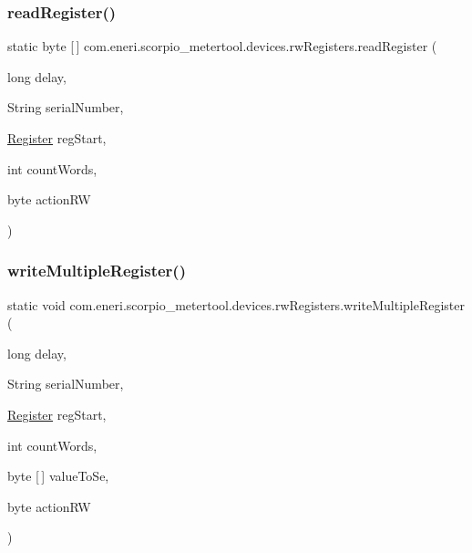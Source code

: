 \subsubsection{\texorpdfstring{read\+Register()}{readRegister()}}
{\footnotesize\ttfamily static byte \mbox{[}$\,$\mbox{]} com.\+eneri.\+scorpio\+\_\+metertool.\+devices.\+rw\+Registers.\+read\+Register (\begin{DoxyParamCaption}\item[{long}]{delay,  }\item[{String}]{serial\+Number,  }\item[{\hyperlink{enumcom_1_1eneri_1_1scorpio__metertool_1_1devices_1_1_register}{Register}}]{reg\+Start,  }\item[{int}]{count\+Words,  }\item[{byte}]{action\+RW }\end{DoxyParamCaption})\hspace{0.3cm}{\ttfamily [static]}}

\mbox{\label{classcom_1_1eneri_1_1scorpio__metertool_1_1devices_1_1rw_registers_a0e767199ee64a5b279df608b2e12caf6}} 
\subsubsection{\texorpdfstring{write\+Multiple\+Register()}{writeMultipleRegister()}}
{\footnotesize\ttfamily static void com.\+eneri.\+scorpio\+\_\+metertool.\+devices.\+rw\+Registers.\+write\+Multiple\+Register (\begin{DoxyParamCaption}\item[{long}]{delay,  }\item[{String}]{serial\+Number,  }\item[{\hyperlink{enumcom_1_1eneri_1_1scorpio__metertool_1_1devices_1_1_register}{Register}}]{reg\+Start,  }\item[{int}]{count\+Words,  }\item[{byte \mbox{[}$\,$\mbox{]}}]{value\+To\+Se,  }\item[{byte}]{action\+RW }\end{DoxyParamCaption})\hspace{0.3cm}{\ttfamily [static]}}

